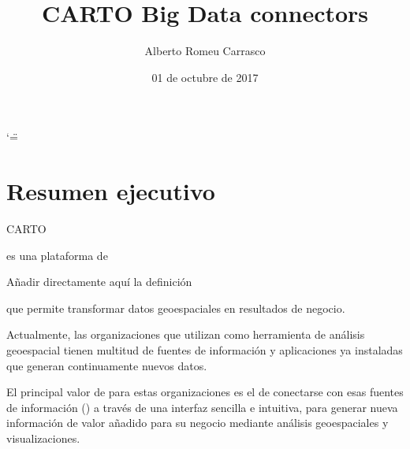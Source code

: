 \documentclass[letterpaper,10pt,spanish]{sphinxmanual}
\title{CARTO Big Data connectors}
\date{01 de octubre de 2017}
\author{Alberto Romeu Carrasco}
\begin{document}
\ifnum\catcode`\"=\active{}\fi
\maketitle
\sphinxtableofcontents
{}\label{\detokenize{index::doc}}



\chapter{Resumen ejecutivo}
\label{\detokenize{tfm/01-abstract::doc}}\label{\detokenize{tfm/01-abstract:resumen-ejecutivo}}\label{\detokenize{tfm/01-abstract:carto-big-data-connectors}}
CARTO %
\begin{footnote}[1]\sphinxAtStartFootnote
{}
%
\end{footnote} es una plataforma de  %
\begin{footnote}[2]\sphinxAtStartFootnote
{\hyperref[\detokenize{tfm/99-glosario:location-intelligence}]{}} Añadir directamente aquí la definición
%
\end{footnote} que permite transformar datos geoespaciales en resultados de negocio.

Actualmente, las organizaciones que utilizan  como herramienta de análisis geoespacial tienen multitud de fuentes de información y aplicaciones ya instaladas que generan continuamente nuevos datos.

El principal valor de  para estas organizaciones es el de conectarse con esas fuentes de información () a través de una interfaz sencilla e intuitiva, para generar nueva información de valor añadido para su negocio mediante análisis geoespaciales y visualizaciones.
\end{document}
